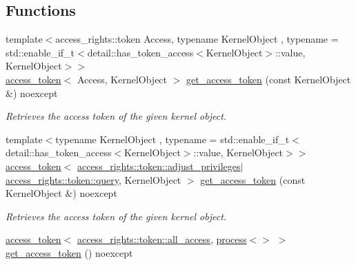 \subsection*{Functions}
\begin{DoxyCompactItemize}
\item 
{\footnotesize template$<$access\+\_\+rights\+::token Access, typename Kernel\+Object , typename  = std\+::enable\+\_\+if\+\_\+t$<$detail\+::has\+\_\+token\+\_\+access$<$\+Kernel\+Object$>$\+::value, Kernel\+Object$>$$>$ }\\\mbox{\hyperlink{classdistant_1_1kernel__objects_1_1access__token}{access\+\_\+token}}$<$ Access, Kernel\+Object $>$ \mbox{\hyperlink{namespacedistant_1_1kernel__objects_a3729729dfaad90c6567da506deef03cf}{get\+\_\+access\+\_\+token}} (const Kernel\+Object \&) noexcept
\begin{DoxyCompactList}\small\item\em Retrieves the access token of the given kernel object. \end{DoxyCompactList}\item 
{\footnotesize template$<$typename Kernel\+Object , typename  = std\+::enable\+\_\+if\+\_\+t$<$detail\+::has\+\_\+token\+\_\+access$<$\+Kernel\+Object$>$\+::value, Kernel\+Object$>$$>$ }\\\mbox{\hyperlink{classdistant_1_1kernel__objects_1_1access__token}{access\+\_\+token}}$<$ \mbox{\hyperlink{structdistant_1_1access__rights_a6b4d9e837868c8c15cf407e4c80d7f3ca59c6fe46f212dd4d2514e1777e707c98}{access\+\_\+rights\+::token\+::adjust\+\_\+privileges}}$\vert$\mbox{\hyperlink{structdistant_1_1access__rights_a6b4d9e837868c8c15cf407e4c80d7f3ca1b1cc7f086b3f074da452bc3129981eb}{access\+\_\+rights\+::token\+::query}}, Kernel\+Object $>$ \mbox{\hyperlink{namespacedistant_1_1kernel__objects_a183f62d57b0b3641d56100f0483242f7}{get\+\_\+access\+\_\+token}} (const Kernel\+Object \&) noexcept
\begin{DoxyCompactList}\small\item\em Retrieves the access token of the given kernel object. \end{DoxyCompactList}\item 
\mbox{\hyperlink{classdistant_1_1kernel__objects_1_1access__token}{access\+\_\+token}}$<$ \mbox{\hyperlink{structdistant_1_1access__rights_a6b4d9e837868c8c15cf407e4c80d7f3ca87233263ddd52f3e3067eafc32d3b7a6}{access\+\_\+rights\+::token\+::all\+\_\+access}}, \mbox{\hyperlink{classdistant_1_1kernel__objects_1_1process}{process}}$<$$>$ $>$ \mbox{\hyperlink{namespacedistant_1_1kernel__objects_a1e4c8c67d58793b7290c032e8e882aa1}{get\+\_\+access\+\_\+token}} () noexcept
$$
\end{DoxyCompactItemize}
